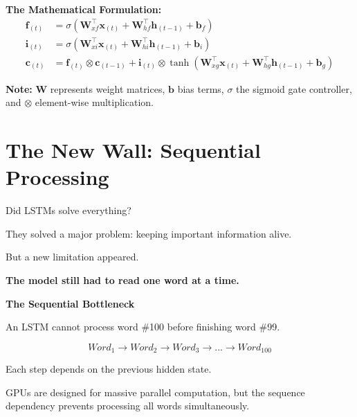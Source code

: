 \documentclass[11pt]{article}
\begin{document}
\textbf{The Mathematical Formulation:}
\begin{align*}
    \mathbf{f}_{(t)} &= \sigma(\mathbf{W}_{xf}^\top \mathbf{x}_{(t)} + \mathbf{W}_{hf}^\top \mathbf{h}_{(t-1)} + \mathbf{b}_f) \\
    \mathbf{i}_{(t)} &= \sigma(\mathbf{W}_{xi}^\top \mathbf{x}_{(t)} + \mathbf{W}_{hi}^\top \mathbf{h}_{(t-1)} + \mathbf{b}_i) \\
    \mathbf{c}_{(t)} &= \mathbf{f}_{(t)} \otimes \mathbf{c}_{(t-1)} + \mathbf{i}_{(t)} \otimes \tanh(\mathbf{W}_{xg}^\top \mathbf{x}_{(t)} + \mathbf{W}_{hg}^\top \mathbf{h}_{(t-1)} + \mathbf{b}_g)
\end{align*}

\vspace{0.02in}
{\fontsize{8}{10}\selectfont\color{brandgray}
\textbf{Note:} $\mathbf{W}$ represents weight matrices, $\mathbf{b}$ bias terms, $\sigma$ the sigmoid gate controller, and $\otimes$ element-wise multiplication.
}

\newpage

\section*{The New Wall: Sequential Processing}

\vspace{0.15in}

Did LSTMs solve everything?

They solved a major problem: keeping important information alive.

But a new limitation appeared.

\textbf{The model still had to read one word at a time.}

\vspace{0.15in}

\begin{darkbox}
{\large\textbf{The Sequential Bottleneck}}

An LSTM cannot process word \#100 before finishing word \#99.

\[
Word_1 \rightarrow Word_2 \rightarrow Word_3 \rightarrow ... \rightarrow Word_{100}
\]

Each step depends on the previous hidden state.

GPUs are designed for massive parallel computation, but the sequence dependency prevents processing all words simultaneously.

\end{darkbox}
\end{document}
